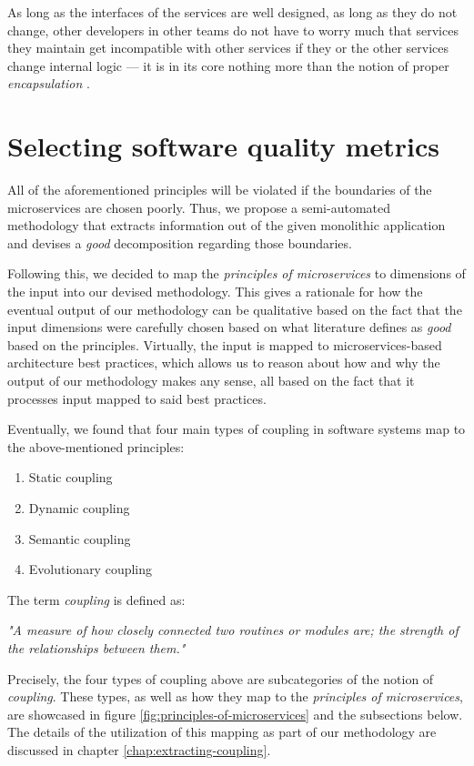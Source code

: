 \documentclass[12pt,a4paper]{report}
\begin{document}
As long as the interfaces of the services are well designed, as long as they do
not change, other developers in other teams do not have to worry much that
services they maintain get incompatible with other services if they or the
other services change internal logic --- it is in its core nothing more than
the notion of proper \textit{encapsulation} \cite{ms-fowler}.



\section{Selecting software quality metrics} \label{sect:software-quality-metrics}

All of the aforementioned principles will be violated if the boundaries of the
microservices are chosen poorly. Thus, we propose a semi-automated methodology
that extracts information out of the given monolithic application and devises a
\textit{good} decomposition regarding those boundaries.

Following this, we decided to map the \textit{principles of microservices} to
dimensions of the input into our devised methodology. This gives a rationale
for how the eventual output of our methodology can be qualitative based on the
fact that the input dimensions were carefully chosen based on what literature
defines as \textit{good} based on the principles. Virtually, the input is
mapped to microservices-based architecture best practices, which allows us to
reason about how and why the output of our methodology makes any sense, all
based on the fact that it processes input mapped to said best practices.

Eventually, we found that four main types of coupling in software systems map
to the above-mentioned principles:
\begin{enumerate}
  \item Static coupling
  \item Dynamic coupling
  \item Semantic coupling
  \item Evolutionary coupling
\end{enumerate} The term \textit{coupling} is defined as:
\begin{displayquote}
  \emph{
  "A measure of how closely connected two routines or modules are;
  the strength of the relationships between them."
  }~\cite{swebok}
\end{displayquote}
Precisely, the four types of coupling above are subcategories of the notion of
\textit{coupling}. These types, as well as how they map to the
\textit{principles of microservices}, are showcased in figure
\ref{fig:principles-of-microservices} and the subsections below.
The details of the utilization of this mapping as part of
our methodology are discussed in chapter \ref{chap:extracting-coupling}.
\end{document}
